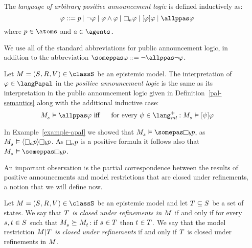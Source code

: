 \begin{definition}\label{papal-syntax}
    The {\em language of arbitrary positive announcement logic \langPapal{}} is defined inductively as:
    $$
        \phi ::=
            \atomP \mid
            \neg \phi \mid
            \phi \land \phi \mid
            \necessary[\agentA] \phi \mid
            \announceA{\phi} \phi \mid
            \allppas \phi
    $$
    where $\atomP \in \atoms$ and $\agentA \in \agents$.
\end{definition}

We use all of the standard abbreviations for public announcement logic, in addition to the abbreviation $\someppas \phi ::= \neg \allppas \neg \phi$.

\begin{definition}\label{papal-semantics}
    Let $\kModelAndTuple \in \classS$ be an epistemic model.
    The interpretation of $\phi \in \langPapal$ in the {\em positive announcement logic \logicPapalS{}} is the same as its interpretation in the public announcement logic \logicPalS{} given in Definition~\ref{pal-semantics} along with the additional inductive case:
    \begin{eqnarray*}
        \kPModel{\kStateS} \entails \allppas \phi &\text{ iff }& \text{ for every } \psi \in \langMlPlus : \kPModel{\kStateS} \entails \announceA{\psi} \phi
    \end{eqnarray*}
\end{definition}

\begin{example}\label{example-papal}
    In Example~\ref{example-apal} we showed that $\kPModel{\kStateS} \entails \somepas \knows[\agentB] \atomP$, as $\kPModel{\kStateS} \entails \announceE{\knows[\agentA] \atomP} \knows[\agentB] \atomP$.
    As $\knows[\agentA] \atomP$ is a positive formula it follows also that $\kPModel{\kStateS} \entails \someppas \knows[\agentB] \atomP$.
\end{example}

An important observation is the partial correspondence between the results of positive announcements and model restrictions that are closed under refinements, a notion that we will define now.

\begin{definition}\label{closed-under-refinements}
    Let $\kModelAndTuple \in \classS$ be an epistemic model and 
    let $\kStatesT \subseteq \kStates$ be a set of states.
    We say that {\em $\kStatesT$ is closed under refinements in $\kModel$} if and only if for every $\kStateS, \kStateT \in \kStates$ such that $\kPModel{\kStateS} \simulates \kPModel{\kStateT}$: if $\kStateS \in \kStatesT$ then $\kStateT \in \kStatesT$.
    We say that the model restriction {\em $\restrict{\kModel}{\kStatesT}$ is closed under refinements} if and only if $\kStatesT$ is closed under refinements in $\kModel$.
\end{definition}

